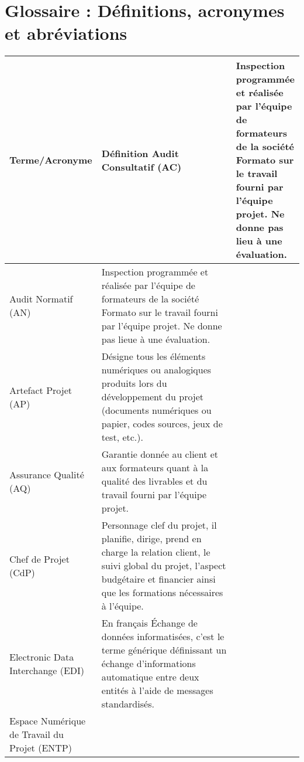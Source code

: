 \documentclass[a4paper,11pt,titlepage]{article}
\begin{document}
\newpage
\section{Glossaire : Définitions, acronymes et abréviations}
\begin{longtable}{|p{0.3\linewidth}|p{0.7\linewidth}|}
    \hline
     Terme/Acronyme         & Définition   \endfirsthead
    \hline
    Audit Consultatif (AC)                                   & Inspection programmée et réalisée par l'équipe de formateurs de la société Formato sur le travail fourni par l'équipe projet. Ne donne pas lieu à une évaluation.                                \\ \hline
    Audit Normatif (AN)                                      & Inspection programmée et réalisée par l'équipe de formateurs de la société Formato sur le travail fourni par l'équipe projet. Ne donne pas lieue à une évaluation.                               \\ \hline
    Artefact Projet (AP)                                     & Désigne tous les éléments numériques ou analogiques produits lors du développement du projet (documents numériques ou papier, codes sources, jeux de test, etc.).                                \\ \hline
    Assurance Qualité (AQ)                                   & Garantie donnée au client et aux formateurs quant à la qualité des livrables et du travail fourni par l'équipe projet.                                                                           \\ \hline
    Chef de Projet (CdP)                                     & Personnage clef du projet, il planifie, dirige, prend en charge la relation client, le suivi global du projet, l'aspect budgétaire et financier ainsi que les formations nécessaires à l'équipe. \\ \hline
    Electronic Data Interchange (EDI)                        & En français Échange de données informatisées, c'est le terme générique définissant un échange d'informations automatique entre deux entités à l'aide de messages standardisés.                   \\ \hline
    Espace Numérique de Travail du Projet (ENTP)             &                                                                                                                                                                                                  \\ \hline

\end{longtable}
\end{document}
